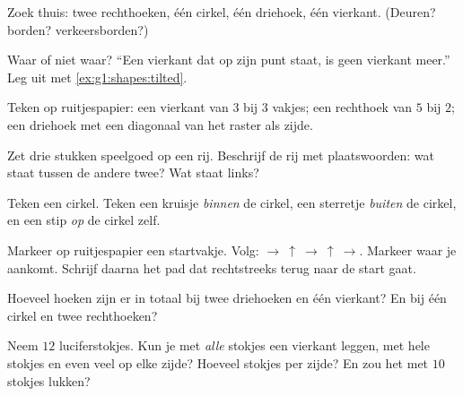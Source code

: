 \begin{exercise}[$\star$]\label{exo:g1:shapes:2}
Zoek thuis: twee rechthoeken, één cirkel, één driehoek, één vierkant.
(Deuren? borden? verkeersborden?)
\end{exercise}

\begin{exercise}[$\star$]\label{exo:g1:shapes:3}
Waar of niet waar? ``Een vierkant dat op zijn punt staat, is geen
vierkant meer.'' Leg uit met \cref{ex:g1:shapes:tilted}.
\end{exercise}

\begin{exercise}[$\star$]\label{exo:g1:shapes:4}
Teken op ruitjespapier: een vierkant van $3$ bij $3$ vakjes; een
rechthoek van $5$ bij $2$; een driehoek met een diagonaal van het
raster als zijde.
\end{exercise}

\begin{exercise}[$\star$]\label{exo:g1:shapes:5}
Zet drie stukken speelgoed op een rij. Beschrijf de rij met
plaatswoorden: wat staat tussen de andere twee? Wat staat links?
\end{exercise}

\begin{exercise}[$\star$]\label{exo:g1:shapes:6}
Teken een cirkel. Teken een kruisje \emph{binnen} de cirkel, een
sterretje \emph{buiten} de cirkel, en een stip \emph{op} de cirkel
zelf.
\end{exercise}

\begin{exercise}[$\star$]\label{exo:g1:shapes:7}
Markeer op ruitjespapier een startvakje. Volg:
$\to\ \uparrow\ \to\ \uparrow\ \to$. Markeer waar je aankomt. Schrijf
daarna het pad dat rechtstreeks terug naar de start gaat.
\end{exercise}

\begin{exercise}[$\star$]\label{exo:g1:shapes:8}
Hoeveel hoeken zijn er in totaal bij twee driehoeken en één vierkant?
En bij één cirkel en twee rechthoeken?
\end{exercise}

\begin{exercise}[$\star\star$]\label{exo:g1:shapes:9}
Neem $12$ luciferstokjes. Kun je met \emph{alle} stokjes een vierkant
leggen, met hele stokjes en even veel op elke zijde? Hoeveel stokjes
per zijde? En zou het met $10$ stokjes lukken?
\end{exercise}
